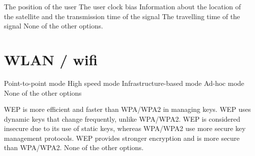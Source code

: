 \begin{questions}
    \begin{checkboxes}
        \choice The position of the user
        \choice The user clock bias
        \CorrectChoice Information about the location of the satellite and the transmission time of the signal
        \choice The travelling time of the signal
        \choice None of the other options.
    \end{checkboxes}



    \section{WLAN / wifi}

    \begin{checkboxes}
        \choice Point-to-point mode
        \choice High speed mode
        \CorrectChoice Infrastructure-based mode
        \CorrectChoice Ad-hoc mode
        \choice None of the other options

    \end{checkboxes}




    \begin{checkboxes}
        \choice WEP is more efficient and faster than WPA/WPA2 in managing keys.
        \choice WEP uses dynamic keys that change frequently, unlike WPA/WPA2.
        \CorrectChoice WEP is considered insecure due to its use of static keys, whereas WPA/WPA2 use more secure key management protocols.
        \choice WEP provides stronger encryption and is more secure than WPA/WPA2.
        \choice None of the other options.
    \end{checkboxes}





\end{questions}
